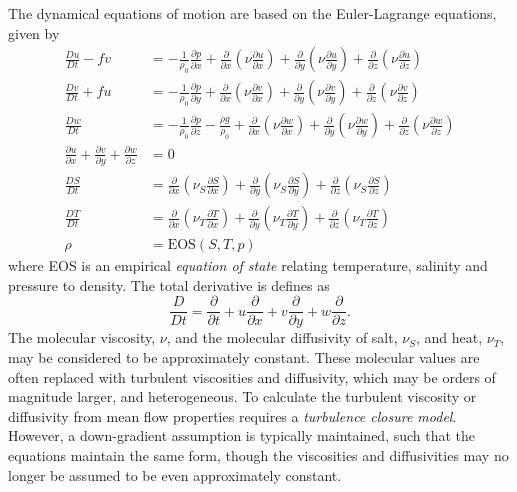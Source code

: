 \documentclass[11pt]{report}
\numberwithin{equation}{section}
\begin{document}
The dynamical equations of motion are based on the Euler-Lagrange equations, given by
\begin{align}
    \frac{Du}{Dt} - fv &= 
        -\frac{1}{\rho_0}\frac{\partial p}{\partial x} 
        + \frac{\partial}{\partial x}(\nu \frac{\partial u}{\partial x} )  
        + \frac{\partial}{\partial y}(\nu \frac{\partial u}{\partial y} )  
        + \frac{\partial}{\partial z}(\nu \frac{\partial u}{\partial z} ) \label{eq:u-full} \\
    \frac{Dv}{Dt} + fu &= 
        -\frac{1}{\rho_0}\frac{\partial p}{\partial y} 
        + \frac{\partial}{\partial x}(\nu \frac{\partial v}{\partial x} )  
        + \frac{\partial}{\partial y}(\nu \frac{\partial v}{\partial y} )  
        + \frac{\partial}{\partial z}(\nu \frac{\partial v}{\partial z} ) \label{eq:v-full} \\
    \frac{Dw}{Dt}      &= 
        -\frac{1}{\rho_0}\frac{\partial p}{\partial z} - \frac{\rho g}{\rho_0} 
        + \frac{\partial}{\partial x}(\nu \frac{\partial w}{\partial x} )  
        + \frac{\partial}{\partial y}(\nu \frac{\partial w}{\partial y} )  
        + \frac{\partial}{\partial z}(\nu \frac{\partial w}{\partial z} ) \label{eq:w}\\
    \frac{\partial u}{\partial x} + \frac{\partial v}{\partial y} + \frac{\partial w}{\partial z} &= 0 \label{eq:cont}\\
    \frac{DS}{Dt} &= 
          \frac{\partial}{\partial x}(\nu_S \frac{\partial S}{\partial x} )  
        + \frac{\partial}{\partial y}(\nu_S \frac{\partial S}{\partial y} )  
        + \frac{\partial}{\partial z}(\nu_S \frac{\partial S}{\partial z} ) \label{eq:salt}\\
    \frac{DT}{Dt} &= 
          \frac{\partial}{\partial x}(\nu_T \frac{\partial T}{\partial x} )  
        + \frac{\partial}{\partial y}(\nu_T \frac{\partial T}{\partial y} )  
        + \frac{\partial}{\partial z}(\nu_T \frac{\partial T}{\partial z} ) \label{eq:temp}\\
    \rho &= \mathrm{EOS}(S, T, p) \label{eq:eos}
\end{align}
where EOS is an empirical {\it equation of state} relating temperature, salinity and pressure to density.  The total derivative is defines as
\begin{equation}
    \frac{D}{Dt} = \frac{\partial}{\partial t} + u \frac{\partial}{\partial x} 
                    + v \frac{\partial}{\partial y} + w \frac{\partial}{\partial z}.
\end{equation}
The molecular viscosity, $\nu$, and the molecular diffusivity of salt, $\nu_S$, and heat, $\nu_T$, may be considered to be approximately constant.  These molecular values are often replaced with turbulent viscosities and diffusivity, which may be orders of magnitude larger, and heterogeneous.  To calculate the turbulent viscosity or diffusivity from mean flow properties requires a {\it turbulence closure model}.  However, a down-gradient assumption is typically maintained, such that the equations maintain the same form, though the viscosities and diffusivities may no longer be assumed to be even approximately constant.
\end{document}

